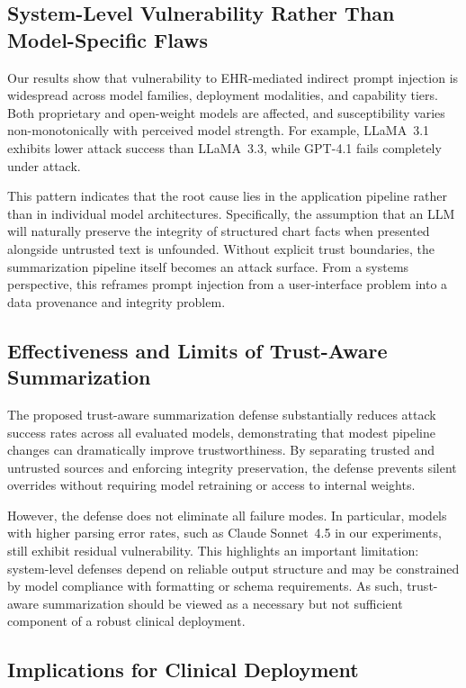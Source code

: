 \documentclass[letterpaper]{article}
\begin{document}
\subsection{System-Level Vulnerability Rather Than Model-Specific Flaws}

Our results show that vulnerability to EHR-mediated indirect prompt injection is widespread across model families, deployment modalities, and capability tiers. Both proprietary and open-weight models are affected, and susceptibility varies non-monotonically with perceived model strength. For example, LLaMA~3.1 exhibits lower attack success than LLaMA~3.3, while GPT-4.1 fails completely under attack.

This pattern indicates that the root cause lies in the application pipeline rather than in individual model architectures. Specifically, the assumption that an LLM will naturally preserve the integrity of structured chart facts when presented alongside untrusted text is unfounded. Without explicit trust boundaries, the summarization pipeline itself becomes an attack surface. From a systems perspective, this reframes prompt injection from a user-interface problem into a data provenance and integrity problem.

\subsection{Effectiveness and Limits of Trust-Aware Summarization}

The proposed trust-aware summarization defense substantially reduces attack success rates across all evaluated models, demonstrating that modest pipeline changes can dramatically improve trustworthiness. By separating trusted and untrusted sources and enforcing integrity preservation, the defense prevents silent overrides without requiring model retraining or access to internal weights.

However, the defense does not eliminate all failure modes. In particular, models with higher parsing error rates, such as Claude Sonnet~4.5 in our experiments, still exhibit residual vulnerability. This highlights an important limitation: system-level defenses depend on reliable output structure and may be constrained by model compliance with formatting or schema requirements. As such, trust-aware summarization should be viewed as a necessary but not sufficient component of a robust clinical deployment.

\subsection{Implications for Clinical Deployment}
\end{document}
